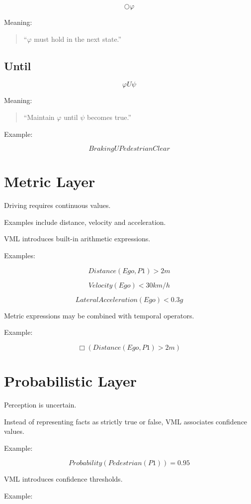 \documentclass[11pt,a4paper]{article}
\begin{document}
\[
\bigcirc \varphi
\]

Meaning:

\begin{quote}
``\(\varphi\) must hold in the next state.''
\end{quote}

\subsection{Until}

\[
\varphi U \psi
\]

Meaning:

\begin{quote}
``Maintain \(\varphi\) until \(\psi\) becomes true.''
\end{quote}

Example:

\[
Braking
U
PedestrianClear
\]

\section{Metric Layer}

Driving requires continuous values.

Examples include distance, velocity and acceleration.

VML introduces built-in arithmetic expressions.

Examples:

\[
Distance(Ego,P1) > 2m
\]

\[
Velocity(Ego) < 30km/h
\]

\[
LateralAcceleration(Ego) < 0.3g
\]

Metric expressions may be combined with temporal operators.

Example:

\[
\Box
(
Distance(Ego,P1) > 2m
)
\]

\section{Probabilistic Layer}

Perception is uncertain.

Instead of representing facts as strictly true or false, VML
associates confidence values.

Example:

\[
Probability(Pedestrian(P1))
=
0.95
\]

VML introduces confidence thresholds.

Example:
\end{document}
